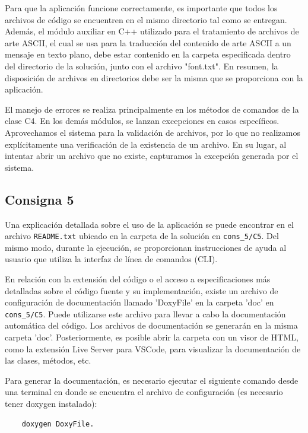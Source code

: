 \documentclass[a4paper,12pt]{article}
\begin{document}
Para que la aplicación funcione correctamente, es importante que todos los archivos de código se encuentren en el mismo directorio tal como se entregan. Además, el módulo auxiliar en C++ utilizado para el tratamiento de archivos de arte ASCII, el cual se usa para la traducción del contenido de arte ASCII a un mensaje en texto plano, debe estar contenido en la carpeta especificada dentro del directorio de la solución, junto con el archivo "font.txt". En resumen, la disposición de archivos en directorios debe ser la misma que se proporciona con la aplicación.

El manejo de errores se realiza principalmente en los métodos de comandos de la clase C4. En los demás módulos, se lanzan excepciones en casos específicos. Aprovechamos el sistema para la validación de archivos, por lo que no realizamos explícitamente una verificación de la existencia de un archivo. En su lugar, al intentar abrir un archivo que no existe, capturamos la excepción generada por el sistema.


\subsection{Consigna 5}
Una explicación detallada sobre el uso de la aplicación se puede encontrar en el archivo
\texttt{README.txt} ubicado en la carpeta de la solución en \texttt{cons\_5/C5}. Del mismo modo, durante la ejecución,
se proporcionan instrucciones de ayuda al usuario que utiliza la interfaz de línea de comandos (CLI).

En relación con la extensión del código o el acceso a especificaciones más detalladas sobre el código
fuente y su implementación, existe un archivo de configuración de documentación llamado 'DoxyFile' en
la carpeta 'doc' en \texttt{cons\_5/C5}. Puede utilizarse este archivo para llevar a cabo la documentación
automática del código. Los archivos de documentación se generarán en la misma carpeta 'doc'. Posteriormente,
es posible abrir la carpeta con un visor de HTML, como la extensión Live Server para VSCode, para visualizar
la documentación de las clases, métodos, etc.

Para generar la documentación, es necesario ejecutar el siguiente comando desde una terminal
en donde se encuentra el archivo de configuración (es necesario tener doxygen instalado):

\begin{verbatim}
    doxygen DoxyFile.
\end{verbatim}
\end{document}
